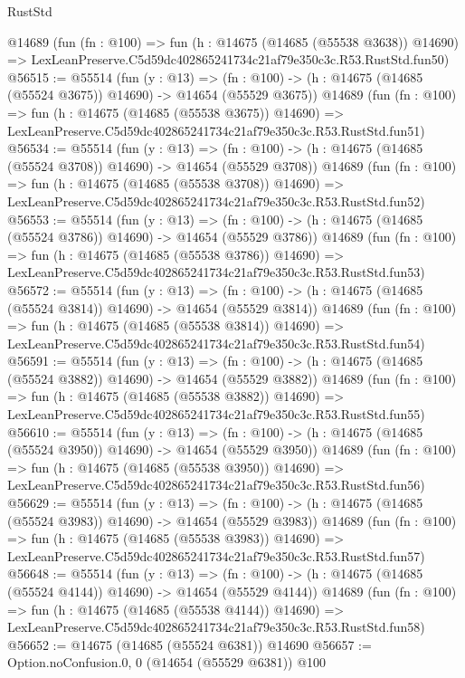 \begin{lexlean}{RustStd}
\begin{coremodule}
    @14689
    (fun (fn : @100) =>
    fun (h : @14675 (@14685 (@55538 @3638)) @14690) =>
    LexLeanPreserve.C5d59dc402865241734c21af79e350c3c.R53.RustStd.fun50)
@56515 := @55514
    (fun (y : @13) =>
    (fn : @100) -> (h : @14675 (@14685 (@55524 @3675)) @14690) -> @14654 (@55529 @3675))
    @14689
    (fun (fn : @100) =>
    fun (h : @14675 (@14685 (@55538 @3675)) @14690) =>
    LexLeanPreserve.C5d59dc402865241734c21af79e350c3c.R53.RustStd.fun51)
@56534 := @55514
    (fun (y : @13) =>
    (fn : @100) -> (h : @14675 (@14685 (@55524 @3708)) @14690) -> @14654 (@55529 @3708))
    @14689
    (fun (fn : @100) =>
    fun (h : @14675 (@14685 (@55538 @3708)) @14690) =>
    LexLeanPreserve.C5d59dc402865241734c21af79e350c3c.R53.RustStd.fun52)
@56553 := @55514
    (fun (y : @13) =>
    (fn : @100) -> (h : @14675 (@14685 (@55524 @3786)) @14690) -> @14654 (@55529 @3786))
    @14689
    (fun (fn : @100) =>
    fun (h : @14675 (@14685 (@55538 @3786)) @14690) =>
    LexLeanPreserve.C5d59dc402865241734c21af79e350c3c.R53.RustStd.fun53)
@56572 := @55514
    (fun (y : @13) =>
    (fn : @100) -> (h : @14675 (@14685 (@55524 @3814)) @14690) -> @14654 (@55529 @3814))
    @14689
    (fun (fn : @100) =>
    fun (h : @14675 (@14685 (@55538 @3814)) @14690) =>
    LexLeanPreserve.C5d59dc402865241734c21af79e350c3c.R53.RustStd.fun54)
@56591 := @55514
    (fun (y : @13) =>
    (fn : @100) -> (h : @14675 (@14685 (@55524 @3882)) @14690) -> @14654 (@55529 @3882))
    @14689
    (fun (fn : @100) =>
    fun (h : @14675 (@14685 (@55538 @3882)) @14690) =>
    LexLeanPreserve.C5d59dc402865241734c21af79e350c3c.R53.RustStd.fun55)
@56610 := @55514
    (fun (y : @13) =>
    (fn : @100) -> (h : @14675 (@14685 (@55524 @3950)) @14690) -> @14654 (@55529 @3950))
    @14689
    (fun (fn : @100) =>
    fun (h : @14675 (@14685 (@55538 @3950)) @14690) =>
    LexLeanPreserve.C5d59dc402865241734c21af79e350c3c.R53.RustStd.fun56)
@56629 := @55514
    (fun (y : @13) =>
    (fn : @100) -> (h : @14675 (@14685 (@55524 @3983)) @14690) -> @14654 (@55529 @3983))
    @14689
    (fun (fn : @100) =>
    fun (h : @14675 (@14685 (@55538 @3983)) @14690) =>
    LexLeanPreserve.C5d59dc402865241734c21af79e350c3c.R53.RustStd.fun57)
@56648 := @55514
    (fun (y : @13) =>
    (fn : @100) -> (h : @14675 (@14685 (@55524 @4144)) @14690) -> @14654 (@55529 @4144))
    @14689
    (fun (fn : @100) =>
    fun (h : @14675 (@14685 (@55538 @4144)) @14690) =>
    LexLeanPreserve.C5d59dc402865241734c21af79e350c3c.R53.RustStd.fun58)
@56652 := @14675 (@14685 (@55524 @6381)) @14690
@56657 := Option.noConfusion.{0, 0} (@14654 (@55529 @6381)) @100

\end{coremodule}
\end{lexlean}
